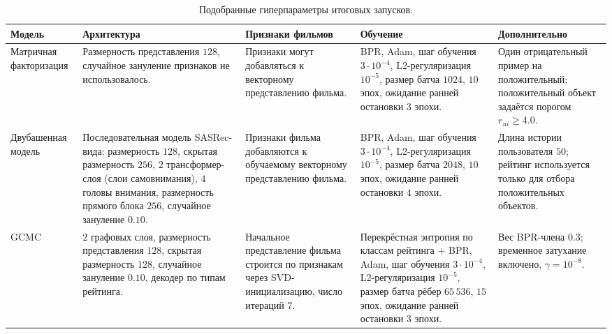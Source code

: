\documentclass[12pt,fleqn]{article}
\begin{document}
\begin{table}[H]
\centering
\scriptsize
\renewcommand{\tabcolsep}{4pt}
\renewcommand{\arraystretch}{1.18}
\caption{Подобранные гиперпараметры итоговых запусков.}
\label{tab:appendix_best_hyperparams}
\begin{tabular}{p{}p{}p{}p{}p{}}
\toprule
Модель & Архитектура & Признаки фильмов & Обучение & Дополнительно \\
\midrule

Матричная факторизация
&
Размерность представления $128$, случайное зануление признаков не использовалось.
&
Признаки могут добавляться к векторному представлению фильма.
&
BPR, Adam, шаг обучения $3\cdot10^{-4}$,
L2-регуляризация $10^{-5}$, размер батча $1024$, $10$ эпох, ожидание ранней
остановки $3$ эпохи.
&
Один отрицательный пример на положительный; положительный объект задаётся
порогом $r_{ui}\ge 4.0$.
\\
\addlinespace

Двубашенная модель
&
Последовательная модель SASRec-вида: размерность $128$, скрытая размерность $256$,
$2$ трансформер-слоя (слои самовнимания), $4$ головы внимания, размерность
прямого блока $256$, случайное зануление $0.10$.
&
Признаки фильма добавляются к обучаемому векторному представлению фильма.
&
BPR, Adam, шаг обучения $3\cdot10^{-4}$, L2-регуляризация $10^{-5}$,
размер батча $2048$, $10$ эпох, ожидание ранней остановки $4$ эпохи.
&
Длина истории пользователя $50$; рейтинг используется только для отбора
положительных объектов.
\\
\addlinespace

GCMC
&
$2$ графовых слоя, размерность представления $128$, скрытая размерность $128$,
случайное зануление $0.10$, декодер по типам рейтинга.
&
Начальное представление фильма строится по признакам через SVD-инициализацию,
число итераций $7$.
&
Перекрёстная энтропия по классам рейтинга + BPR, Adam, шаг обучения
$3\cdot10^{-4}$, L2-регуляризация $10^{-5}$, размер батча рёбер $65\,536$,
$15$ эпох, ожидание ранней остановки $3$ эпохи.
&
Вес BPR-члена $0.3$; временное
затухание включено, $\gamma=10^{-8}$.
\\

\bottomrule
\end{tabular}
\end{table}

\clearpage
\end{document}
